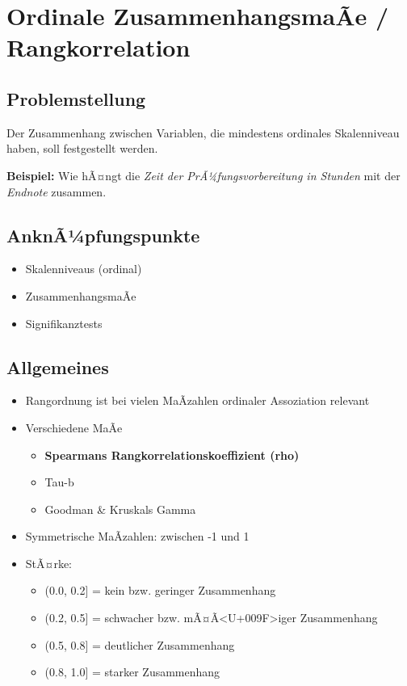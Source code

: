 \documentclass[
]{book}
\providecommand{\tightlist}{%
  \setlength{\itemsep}{0pt}\setlength{\parskip}{0pt}}
\begin{document}
\hypertarget{ordinale-zusammenhangsmauxe3e-rangkorrelation}{%
\chapter{Ordinale ZusammenhangsmaÃe / Rangkorrelation}\label{ordinale-zusammenhangsmauxe3e-rangkorrelation}}

\hypertarget{problemstellung-5}{%
\section{Problemstellung}\label{problemstellung-5}}

Der Zusammenhang zwischen Variablen, die mindestens ordinales Skalenniveau haben, soll festgestellt werden.

\textbf{Beispiel:} Wie hÃ¤ngt die \emph{Zeit der PrÃ¼fungsvorbereitung in Stunden} mit der \emph{Endnote} zusammen.

\hypertarget{anknuxe3uxbcpfungspunkte-1}{%
\section{AnknÃ¼pfungspunkte}\label{anknuxe3uxbcpfungspunkte-1}}

\begin{itemize}
\tightlist
\item
  Skalenniveaus (ordinal)
\item
  ZusammenhangsmaÃe
\item
  Signifikanztests
\end{itemize}

\hypertarget{allgemeines-8}{%
\section{Allgemeines}\label{allgemeines-8}}

\begin{itemize}
\tightlist
\item
  Rangordnung ist bei vielen MaÃzahlen ordinaler Assoziation relevant
\item
  Verschiedene MaÃe

  \begin{itemize}
  \tightlist
  \item
    \textbf{Spearmans Rangkorrelationskoeffizient (rho)}
  \item
    Tau-b
  \item
    Goodman \& Kruskals Gamma
  \end{itemize}
\item
  Symmetrische MaÃzahlen: zwischen -1 und 1
\item
  StÃ¤rke:

  \begin{itemize}
  \tightlist
  \item
    (0.0, 0.2{]} = kein bzw. geringer Zusammenhang
  \item
    (0.2, 0.5{]} = schwacher bzw. mÃ¤Ã\textless U+009F\textgreater iger Zusammenhang
  \item
    (0.5, 0.8{]} = deutlicher Zusammenhang
  \item
    (0.8, 1.0{]} = starker Zusammenhang
  \end{itemize}
\end{itemize}
\end{document}
